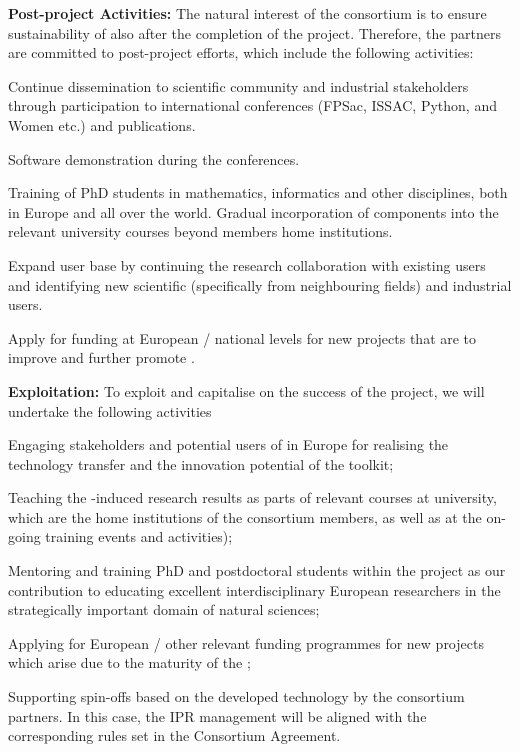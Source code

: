 {\bf Post-project Activities:} The natural interest of the consortium is to ensure sustainability of \TheProject also after the completion of the project. Therefore, the partners are committed to post-project efforts, which include the following activities: 
\begin{compactenum}
\item Continue dissemination to scientific community and industrial stakeholders through participation to international conferences (FPSac, ISSAC, Python, \Sage and Women etc.) and publications.
\item Software demonstration during the conferences.
\item Training of  PhD students in mathematics, informatics and other disciplines, both in Europe and all over the world. Gradual incorporation of \TheProject components into the relevant university courses beyond \TheProject members home institutions.
\item Expand \TheProject user base by continuing the research collaboration with existing users and  identifying new scientific (specifically from neighbouring fields) and industrial users.
\item Apply for funding at European / national levels for new projects that are to improve and further promote \TheProject.
\end{compactenum}


{\bf Exploitation:} To exploit and capitalise on the success of the project, we will undertake the following activities
\begin{compactenum}
\item Engaging stakeholders and potential users of \TheProject in Europe for realising the technology transfer and the innovation potential of the toolkit;
\item Teaching the \TheProject-induced research results as parts of relevant courses at university, which are the home institutions of the consortium members, as well as at the on-going training events and activities);
\item Mentoring and training PhD and postdoctoral students within the project as our contribution to educating excellent interdisciplinary European researchers in the strategically important domain of natural sciences;
\item Applying for European / other relevant funding programmes for new projects which arise due to the maturity of the \TheProject;
\item Supporting spin-offs based on the developed technology by the consortium partners. In this case, the IPR management will be aligned with the corresponding rules set in the Consortium Agreement.
\end{compactenum}

